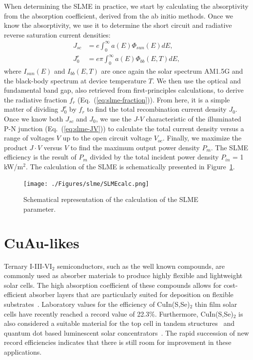 \begin{refsection}
When determining the SLME in practice, we start by calculating the absorptivity from the absorption coefficient, derived from the ab initio methods. Once we know the absorptivity, we use it to determine the short circuit and radiative reverse saturation current densities:
\begin{equation} \label{eq:slme-currents}
\begin{aligned}
J_{sc} &= e \int_0^\infty a(E)  \Phi_{sun} (E) dE,
\\ J_0^r &= e\pi \int_0^\infty a(E)  \Phi_{bb} (E,T) dE,
\end{aligned}
\end{equation}
where $I_{sun}(E)$ and $I_{bb}(E,T)$ are once again the solar spectrum AM1.5G  and the black-body spectrum at device temperature $T$. We then use the optical and fundamental band gap, also retrieved from first-principles calculations, to derive the radiative fraction $f_r$ (Eq.~(\ref{eq:slme-fraction})). From here, it is a simple matter of dividing $J_0^r$ by $f_r$ to find the total recombination current density $J_0$. Once we know both $J_{sc}$ and $J_0$, we use the $J$-$V$ characteristic of the illuminated P-N junction (Eq.~(\ref{eq:slme-JV})) to calculate the total current density versus a range of voltages $V$ up to the open circuit voltage $V_{oc}$. Finally, we maximize the product $J\cdot V$ versus $V$ to find the maximum output power density $P_m$. The SLME efficiency is the result of $P_m$ divided by the total incident power density $P_{in}$ = 1 kW/m$^2$. The calculation of the SLME is schematically presented in Figure~\ref{fig:slme-SLMEcalc}.

\begin{figure}[h] 
\centering
\texttt{[image: ./Figures/slme/SLMEcalc.png]}
\caption{Schematical representation of the calculation of the SLME parameter.}
\label{fig:slme-SLMEcalc}
\end{figure}

\section{CuAu-likes} \label{sec:slme-CuAu}

Ternary I-III-VI$_2$ semiconductors, such as the well known  compounds, are commonly used as absorber materials to produce highly flexible and lightweight solar cells. The high absorption coefficient of these compounds allows for cost-efficient absorber layers that are particularly suited for deposition on flexible substrates~\cite{Reinhard2013}. Laboratory values for the efficiency of CuIn(S,Se)$_2$ thin film solar cells have recently reached a record value of 22.3\%. Furthermore, CuIn(S,Se)$_2$ is also considered a suitable material for the top cell in tandem structures~\cite{Cheek2013} and quantum dot based luminescent solar concentrators~\cite{Hu2015}. The rapid succession of new record efficiencies indicates that there is still room for improvement in these applications.


\end{refsection}
